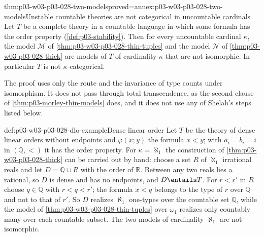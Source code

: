 \begin{hbtheorem}{thm:p03-w03-p03-028-two-models}{proved=annex:p03-w03-p03-028-two-models}{Unstable countable theories are not categorical in uncountable cardinals}
Let \(T\) be a complete theory in a countable language in which some
formula has the order property (\cref{def:p03-stability}).  Then for every
uncountable cardinal \(\kappa\), the model \(\mathcal M\) of
\cref{thm:p03-w03-p03-028-thin-tuples} and the model \(\mathcal N\) of
\cref{thm:p03-w03-p03-028-thick} are models of \(T\) of cardinality
\(\kappa\) that are not isomorphic.  In particular \(T\) is not
\(\kappa\)-categorical.
\end{hbtheorem}

The proof uses only the route and the invariance of type counts under
isomorphism.  It does not pass through total transcendence, as the second
clause of \cref{thm:p03-morley-thin-models} does, and it does not use any
of Shelah's steps listed below.

\begin{hbexample}{def:p03-w03-p03-028-dlo-example}{Dense linear order}
Let \(T\) be the theory of dense linear orders without endpoints and
\(\varphi(x;y)\) the formula \(x<y\); with \(a_i=b_i=i\) in
\((\mathbb Q,<)\) it has the order property.  For \(\kappa=\aleph_1\) the
construction of \cref{thm:p03-w03-p03-028-thick} can be carried out by
hand: choose a set \(R\) of \(\aleph_1\) irrational reals and let
\(D=\mathbb Q\cup R\) with the order of \(\mathbb R\).  Between any two
reals lies a rational, so \(D\) is dense and has no endpoints, and
\(D\entails T\).  For \(r<r'\) in \(R\) choose \(q\in\mathbb Q\) with
\(r<q<r'\); the formula \(x<q\) belongs to the type of \(r\) over
\(\mathbb Q\) and not to that of \(r'\).  So \(D\) realizes \(\aleph_1\)
one-types over the countable set \(\mathbb Q\), while the model of
\cref{thm:p03-w03-p03-028-thin-tuples} over \(\omega_1\) realizes only
countably many over each countable subset.  The two models of cardinality
\(\aleph_1\) are not isomorphic.
\end{hbexample}

